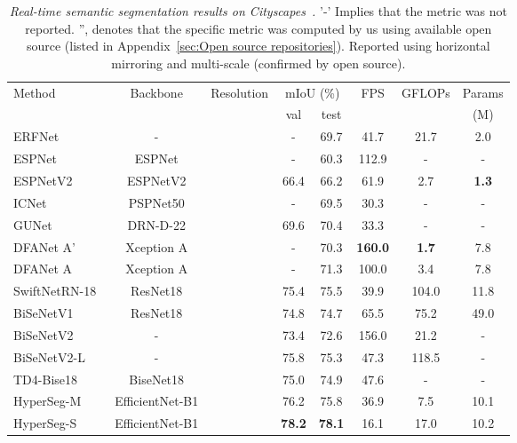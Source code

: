 \documentclass[final]{cvpr}
\begin{document}
\begin{table*}[t!]
\begin{center}
{\begin{tabular}{l c c c c c c c}
\toprule
\multirow{2}{*}{Method} & \multirow{2}{*}{Backbone} & \multirow{2}{*}{Resolution} & \multicolumn{2}{c}{mIoU (\%)}
& \multirow{2}{*}{FPS} & \multirow{2}{*}{GFLOPs} & Params  \\ [0.5ex] 
  & & & val & test & & & (M) \\
  \hline
  ERFNet~\cite{romera2017erfnet} & - &  & - & 69.7 & 41.7 & 21.7 & 2.0 \\
  ESPNet~\cite{mehta2018espnet} & ESPNet &  & - & 60.3 & 112.9 & - & - \\
  ESPNetV2~\cite{mehta2018espnet} & ESPNetV2 &  & 66.4 & 66.2 & 61.9 & 2.7 & \textbf{1.3} \\
  ICNet~\cite{zhao2018icnet} & PSPNet50 &  & - & 69.5 & 30.3 & - & -  \\
  GUNet~\cite{mazzini2018guided} & DRN-D-22 &  & 69.6 & 70.4 & 33.3 & - & - \\
  DFANet A'~\cite{li2019dfanet} & Xception A &  & - & 70.3 & \textbf{160.0} & \textbf{1.7} & 7.8 \\
  DFANet A~\cite{li2019dfanet} & Xception A &  & - & 71.3 & 100.0 & 3.4 & 7.8 \\
  SwiftNetRN-18~\cite{orsic2019defense} & ResNet18 &  & 75.4 & 75.5 & 39.9 & 104.0 & 11.8 \\
  BiSeNetV1~\cite{yu2018bisenet} & ResNet18 &  & 74.8 & 74.7 & 65.5 & 75.2 & 49.0 \\
  BiSeNetV2~\cite{yu2020bisenet} & - &  & 73.4 & 72.6 & 156.0 & 21.2 & - \\ 
  BiSeNetV2-L~\cite{yu2020bisenet} & - &  & 75.8 & 75.3 & 47.3 & 118.5 & - \\ 
  TD4-Bise18~\cite{hu2020temporally} & BiseNet18 &  & 75.0 & 74.9 & 47.6 & - & - \\
\midrule
HyperSeg-M & EfficientNet-B1 &  & 76.2 & 75.8 & 36.9 & 7.5 & 10.1 \\ 
  HyperSeg-S & EfficientNet-B1 &  & \textbf{78.2} & \textbf{78.1} & 16.1 & 17.0 & 10.2 \\ 

  
  \bottomrule
\end{tabular}
}
\end{center}
\caption{\emph{Real-time semantic segmentation results on Cityscapes~\cite{cordts2016cityscapes}.} '-' Implies that the metric was not reported. '', denotes that the specific metric was computed by us using available open source (listed in Appendix~\ref{sec:Open source repositories}). Reported using horizontal mirroring and multi-scale (confirmed by open source).
\vspace{-2mm}
}
\label{tab:cityscapes_quant}
\end{table*}
\end{document}
